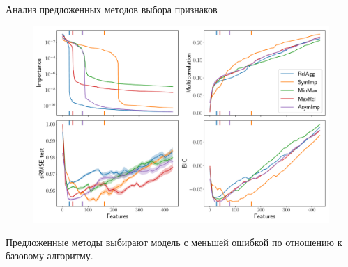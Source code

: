 \documentclass[9pt]{beamer}
\begin{document}
\begin{frame}{Анализ предложенных методов выбора признаков}
	\begin{figure}
		\includegraphics[width=\linewidth]{figs/ecog_3_30_metrics.pdf}
	\end{figure}
	Предложенные методы выбирают модель с меньшей ошибкой по отношению к базовому алгоритму.
\end{frame}
\end{document}
